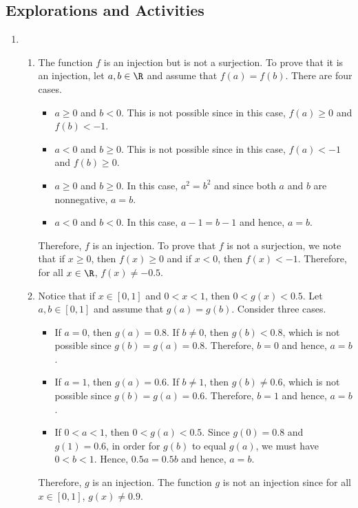 \subsection*{Explorations and Activities}
\setcounter{oldenumi}{\theenumi}
\begin{enumerate} \setcounter{enumi}{\theoldenumi}
\item \begin{enumerate}
\item The function $f$ is an injection but is not a surjection.  To prove that it is an injection, let $a, b \in \R$ and assume that $f(a) = f(b)$.  There are four cases.
\begin{itemize}
\item $a \geq 0$ and $b < 0$.  This is not possible since in this case, $f(a) \geq 0$ and 
$f(b) < -1$.
\item $a < 0$ and $b \geq 0$.  This is not possible since in this case, $f(a) < -1$ and 
$f(b) \geq 0$.
\item $a \geq 0$ and $b \geq 0$.  In this case, $a^2 = b^2$ and since both $a$ and $b$ are nonnegative, $a = b$.
\item $a < 0$ and $b < 0$.  In this case, $a - 1 = b - 1$ and hence, $a = b$.
\end{itemize}
Therefore, $f$ is an injection.  To prove that $f$ is not a surjection, we note that if 
$x \geq 0$, then $f(x) \geq 0$ and if $x < 0$, then $f(x) < -1$.  Therefore, for all 
$x \in \R$, $f(x) \ne -0.5$.


\item Notice that if $x \in [0, 1]$ and $0 < x < 1$, then $0 < g(x) < 0.5$.
Let $a, b \in [0,1]$ and assume that $g(a) = g(b)$.  Consider three cases.
\begin{itemize}
\item If $a = 0$, then $g(a) = 0.8$.  If $b \ne 0$, then $g(b) < 0.8$, which is not possible since $g(b) = g(a) =0.8$.  Therefore, $b = 0$ and hence, $a = b$.

\item If $a = 1$, then $g(a) = 0.6$.  If $b \ne 1$, then $g(b) \ne 0.6$, which is not possible since $g(b) = g(a) =0.6$.  Therefore, $b = 1$ and hence, $a = b$.

\item If $0 < a < 1$, then $0 < g(a) < 0.5$.  Since $g(0) = 0.8$ and $g(1) = 0.6$, in order for $g(b)$ to equal $g(a)$, we must have $0 < b < 1$.  Hence, $0.5a = 0.5b$ and hence, $a = b$.
\end{itemize}
Therefore, $g$ is an injection. The function $g$ is not an injection since for all 
$x \in [0, 1]$, $g(x) \ne 0.9$.


\end{enumerate}
\end{enumerate}
